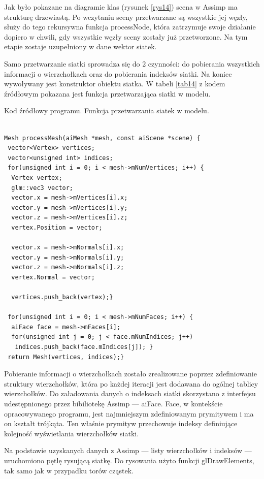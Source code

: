 Jak było pokazane na diagramie klas (rysunek \ref{rys14}) scena w Assimp ma strukturę drzewiastą. Po wczytaniu sceny przetwarzane są wszystkie jej węzły, służy do tego rekursywna funkcja processNode, która zatrzymuje swoje działanie dopiero w chwili, gdy wszystkie węzły sceny zostały już przetworzone. Na tym etapie zostaje uzupełniony w dane wektor siatek.

Samo przetwarzanie siatki sprowadza się do 2 czynności: do pobierania wszystkich informacji o wierzchołkach oraz do pobierania indeksów siatki. Na koniec wywoływany jest konstruktor obiektu siatka. W tabeli \ref{tab14} z kodem źródłowym pokazana jest funkcja przetwarzająca siatki w modelu.

\begin{table}[H]
\caption{Kod źródłowy programu. Funkcja przetwarzania siatek w modelu.}
\label{tab14}
\begin{lstlisting}[frame=single]  % Start your code-block

Mesh processMesh(aiMesh *mesh, const aiScene *scene) {
 vector<Vertex> vertices;
 vector<unsigned int> indices;
 for(unsigned int i = 0; i < mesh->mNumVertices; i++) {
  Vertex vertex;
  glm::vec3 vector;
  vector.x = mesh->mVertices[i].x;
  vector.y = mesh->mVertices[i].y;
  vector.z = mesh->mVertices[i].z;
  vertex.Position = vector;

  vector.x = mesh->mNormals[i].x;
  vector.y = mesh->mNormals[i].y;
  vector.z = mesh->mNormals[i].z;
  vertex.Normal = vector;
  
  vertices.push_back(vertex);}
  
 for(unsigned int i = 0; i < mesh->mNumFaces; i++) {
  aiFace face = mesh->mFaces[i];
  for(unsigned int j = 0; j < face.mNumIndices; j++)
   indices.push_back(face.mIndices[j]); }
 return Mesh(vertices, indices);}
\end{lstlisting}
\end{table}

Pobieranie informacji o wierzchołkach zostało zrealizowane poprzez zdefiniowanie struktury wierzchołków, która po każdej iteracji jest dodawana do ogólnej tablicy wierzchołków. Do załadowania danych o indeksach siatki skorzystano z interfejsu udestępnionego przez bibiliotekę Assimp --- aiFace. Face, w kontekście opracowywanego programu, jest najmniejszym zdefiniowanym prymitywem i ma on kształt trójkąta. Ten właśnie prymityw przechowuje indeksy definiujące kolejność wyświetlania wierzchołków siatki.

Na podstawie uzyskanych danych z Assimp --- listy wierzchołków i indeksów --- uruchomiono pętlę rysującą siatkę. Do rysowania użyto funkcji glDrawElements, tak samo jak w przypadku torów cząstek.

